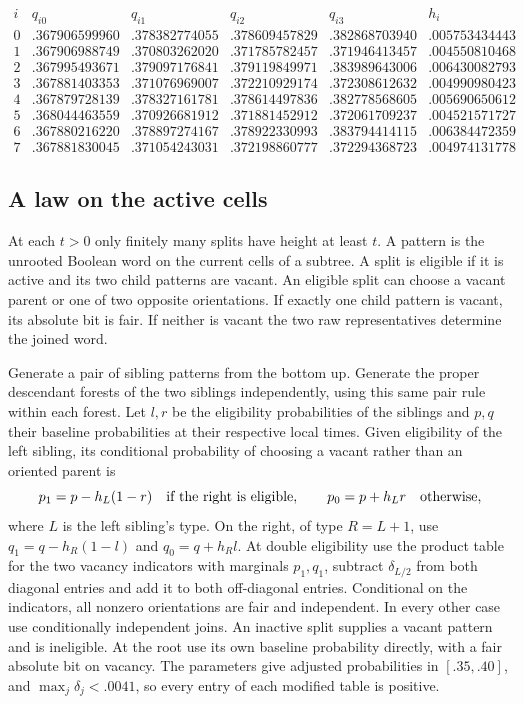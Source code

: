\documentclass[11pt]{article}
\numberwithin{equation}{section}
\begin{document}
{\small
\[
\begin{array}{c|rrrr|r}
i&q_{i0}&q_{i1}&q_{i2}&q_{i3}&h_i\\ \hline
0&.367906599960&.378382774055&.378609457829&.382868703940&.005753434443\\
1&.367906988749&.370803262020&.371785782457&.371946413457&.004550810468\\
2&.367995493671&.379097176841&.379119849971&.383989643006&.006430082793\\
3&.367881403353&.371076969007&.372210929174&.372308612632&.004990980423\\
4&.367879728139&.378327161781&.378614497836&.382778568605&.005690650612\\
5&.368044463559&.370926681912&.371881452912&.372061709237&.004521571727\\
6&.367880216220&.378897274167&.378922330993&.383794414115&.006384472359\\
7&.367881830045&.371054243031&.372198860777&.372294368723&.004974131778
\end{array}
\]}

\subsection{A law on the active cells}

At each $t>0$ only finitely many splits have height at least $t$.
A pattern is the unrooted Boolean word on the current cells of a
subtree. A split is eligible if it is active and its two child
patterns are vacant. An eligible split can choose a vacant parent
or one of two opposite orientations. If exactly one child pattern
is vacant, its absolute bit is fair. If neither is vacant the two
raw representatives determine the joined word.

Generate a pair of sibling patterns from the bottom up. Generate
the proper descendant forests of the two siblings independently,
using this same pair rule within each forest. Let $l,r$ be the
eligibility probabilities of the siblings and $p,q$ their baseline
probabilities at their respective local times. Given eligibility
of the left sibling, its conditional probability of choosing a
vacant rather than an oriented parent is
\[
 p_1=p-h_L(1-r)\quad\hbox{if the right is eligible},
 \qquad p_0=p+h_Lr\quad\hbox{otherwise},
\]
where $L$ is the left sibling's type. On the right, of type $R=L+1$,
use $q_1=q-h_R(1-l)$ and $q_0=q+h_R l$.
At double eligibility use the product table for the two vacancy
indicators with marginals $p_1,q_1$, subtract $\delta_{L/2}$ from
both diagonal entries and add it to both off-diagonal entries.
Conditional on the indicators, all nonzero orientations are fair
and independent. In every other case use conditionally independent
joins. An inactive split supplies a vacant pattern and is ineligible.
At the root use its own baseline probability directly, with a fair
absolute bit on vacancy. The parameters give adjusted probabilities
in $[.35,.40]$, and $\max_j\delta_j<.0041$, so every entry of each
modified table is positive.
\end{document}
